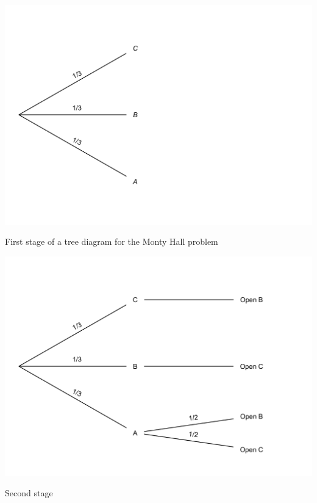 \documentclass[justified]{tufte-book}
\theoremstyle{definition}
\theoremstyle{definition}
\theoremstyle{definition}
\theoremstyle{definition}
\theoremstyle{remark}
\begin{document}
\begin{marginfigure}
\includegraphics{_main_files/figure-latex/montytree1-1} \caption[First stage of a tree diagram for the Monty Hall problem]{First stage of a tree diagram for the Monty Hall problem}\label{fig:montytree1}
\end{marginfigure}
\begin{marginfigure}
\includegraphics{_main_files/figure-latex/montytree2-1} \caption[Second stage]{Second stage}\label{fig:montytree2}
\end{marginfigure}
\end{document}
